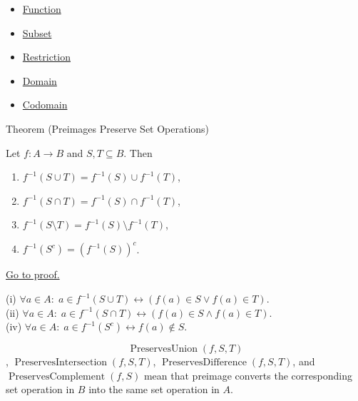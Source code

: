 \begin{dependencies}
\begin{itemize}
  \item \hyperref[def:function]{Function}
  \item \hyperref[def:subset]{Subset}
  \item \hyperref[def:restriction]{Restriction}
  \item \hyperref[def:domain]{Domain}
  \item \hyperref[def:codomain]{Codomain}
\end{itemize}
\end{dependencies}

\begin{theorembox}{Theorem (Preimages Preserve Set Operations)}
\begin{theorem}\label{thm:preimage-ops}
Let $f : A \to B$ and $S, T \subseteq B$. Then
\begin{enumerate}[label=(\roman*)]
\item $f^{-1}(S \cup T) = f^{-1}(S) \cup f^{-1}(T)$,
\item $f^{-1}(S \cap T) = f^{-1}(S) \cap f^{-1}(T)$,
\item $f^{-1}(S \setminus T) = f^{-1}(S) \setminus f^{-1}(T)$,
\item $f^{-1}(S^c) = (f^{-1}(S))^c$.
\end{enumerate}
\hyperref[prf:preimage-ops]{Go to proof.}
\end{theorem}
\end{theorembox}

\begin{remark*}
(i) $\forall a \in A:\; a \in f^{-1}(S\cup T) \leftrightarrow (f(a)\in S \vee f(a)\in T)$.\\
(ii) $\forall a \in A:\; a \in f^{-1}(S\cap T) \leftrightarrow (f(a)\in S \wedge f(a)\in T)$.\\
(iv) $\forall a \in A:\; a \in f^{-1}(S^c) \leftrightarrow f(a)\notin S$.
\end{remark*}

\begin{remark*}
\[
  \operatorname{PreservesUnion}(f,S,T)
\],
$\operatorname{PreservesIntersection}(f,S,T)$,
$\operatorname{PreservesDifference}(f,S,T)$, and
$\operatorname{PreservesComplement}(f,S)$ mean that preimage converts
the corresponding set operation in $B$ into the same set operation in $A$.
\end{remark*}

